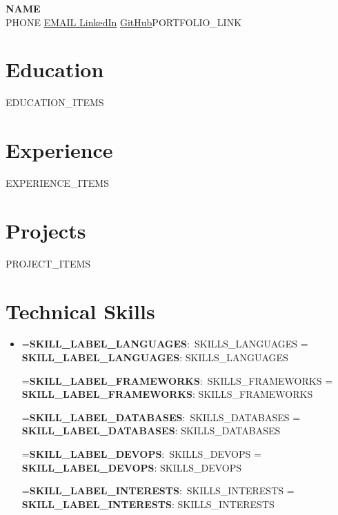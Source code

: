\documentclass[letterpaper,10.5pt]{article}
\newcommand{\resumeSubHeadingListStart}{\begin{itemize}[leftmargin=0.15in, label={}, topsep=0pt, parsep=0pt, itemsep=7pt]}
\newcommand{\resumeSubHeadingListEnd}{\end{itemize}}
\newcommand{\skillrowtext}[2]{\textbf{#1}{: #2}}
\newlength{\skillrowbox}
\newcommand{\skillrow}[2]{%
  \setbox0=\hbox{\small\skillrowtext{#1}{#2}}%
  \skillrowbox=\wd0
  \ifdim\skillrowbox>\linewidth
    \setbox0=\hbox{\footnotesize\skillrowtext{#1}{#2}}%
    \skillrowbox=\wd0
    \ifdim\skillrowbox>\linewidth
      \scriptsize\skillrowtext{#1}{#2}\\
    \else
      \footnotesize\skillrowtext{#1}{#2}\\
    \fi
  \else
    \small\skillrowtext{#1}{#2}\\
  \fi
}
\begin{document}
\begin{center}
    \textbf{\Huge \scshape {{NAME}}} \\ \vspace{2pt}
    \small {{PHONE}} \hspace{1pt}
    \href{mailto:{{EMAIL}}}{\underline{ {{EMAIL}} }} \hspace{1pt}
    \href{https://linkedin.com/in/{{LINKEDIN_HANDLE}}}{\underline{LinkedIn}} \hspace{1pt}
    \href{https://github.com/{{GITHUB_HANDLE}}}{\underline{GitHub}}{{PORTFOLIO_LINK}}
\end{center}

\section{Education}
  \resumeSubHeadingListStart
{{EDUCATION_ITEMS}}
  \resumeSubHeadingListEnd

\section{Experience}
  \resumeSubHeadingListStart
{{EXPERIENCE_ITEMS}}
  \resumeSubHeadingListEnd

\vspace{-6pt}
\section{Projects}
    \resumeSubHeadingListStart
{{PROJECT_ITEMS}}
    \resumeSubHeadingListEnd

\vspace{-7pt}
\section{Technical Skills}
 \begin{itemize}[leftmargin=0.15in, label={}, topsep=0pt, parsep=0pt, itemsep=0pt]
    \item{
     \skillrow{{{SKILL_LABEL_LANGUAGES}}}{{{SKILLS_LANGUAGES}}}
     \skillrow{{{SKILL_LABEL_FRAMEWORKS}}}{{{SKILLS_FRAMEWORKS}}}
     \skillrow{{{SKILL_LABEL_DATABASES}}}{{{SKILLS_DATABASES}}}
     \skillrow{{{SKILL_LABEL_DEVOPS}}}{{{SKILLS_DEVOPS}}}
     \skillrow{{{SKILL_LABEL_INTERESTS}}}{{{SKILLS_INTERESTS}}}
    }
 \end{itemize}
\end{document}
